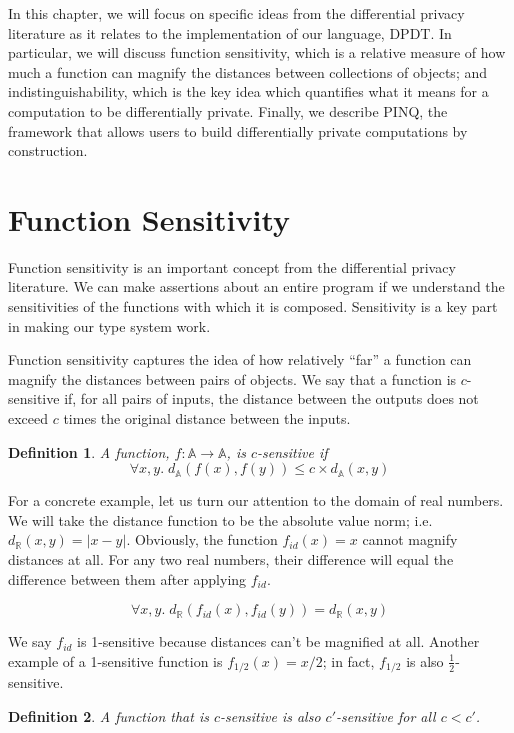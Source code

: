 \documentclass[12pt]{report}
\newtheorem{defn}{Definition}[section]
\begin{document}
In this chapter, we will focus on specific ideas from the differential privacy literature as it relates to the implementation of our language, DPDT.
In particular, we will discuss function sensitivity, which is a relative measure of how much a function can magnify the distances between collections of objects; and indistinguishability, which is the key idea which quantifies what it means for a computation to be differentially private.
Finally, we describe PINQ, the framework that allows users to build differentially private computations by construction.

\section{Function Sensitivity}\label{subsec:fn_sens}

Function sensitivity is an important concept from the differential privacy literature.
We can make assertions about an entire program if we understand the sensitivities of the functions with which it is composed.
Sensitivity is a key part in making our type system work.

Function sensitivity captures the idea of how relatively ``far'' a function can magnify the distances between pairs of objects.
We say that a function is $c$-sensitive if, for all pairs of inputs, the distance between the outputs does not exceed $c$ times the original distance between the inputs.

\begin{defn}\label{def:csens}
  A function, $f : \mathbb A \rightarrow \mathbb A$, is $c$-sensitive if
  $$\forall x,y.\; d_{\mathbb A}(f(x),f(y)) \le c \times d_{\mathbb A}(x,y)$$
\end{defn}

For a concrete example, let us turn our attention to the domain of real numbers.
We will take the distance function to be the absolute value norm; i.e. $d_\mathbb{R}(x,y) = |x - y|$.
Obviously, the function $f_{id}(x)=x$ cannot magnify distances at all.
For any two real numbers, their difference will equal the difference between them after applying $f_{id}$.

\[
  \forall x,y.\; d_\mathbb{R}(f_{id}(x),f_{id}(y)) = d_\mathbb{R}(x,y)
\]

We say $f_{id}$ is 1-sensitive because distances can't be magnified at all.
Another example of a 1-sensitive function is $f_{1/2}(x) = x/2$; in fact, $f_{1/2}$ is also $\frac{1}{2}$-sensitive.

\begin{defn}\label{def:clessthancprime}
  A function that is $c$-sensitive is also $c'$-sensitive for all $c < c'$.
\end{defn}
\end{document}
